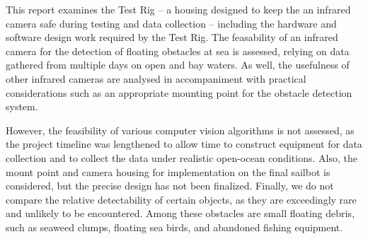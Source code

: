 
\iffalse
From the guideline:
This is where the subject of the report can be specified fully; indicate not only what you are examining, but also when and where, as appropriate. As well as knowing what to expect in your report, your reader needs to know what not to expect. Indicate the kinds of problems, places, times, and personnel that are not considered and the impact these omissions and constraints may have on your results. You may also want to explain why these limitations have been necessary.

Notes:
what does the report consider?
-test rig, design and development
-testing IR camera feasibility on two days
-developing a control system for the test rig, allowing for video capture
-the team might be able to get a better camera
-long cables seem to be fine

what didn't we do?
-we don't evaluate which algorithms are best
--we spent a lot of time getting ready to gather data (getting test rigs built and working)
--lots of time on video processing systems to get good contrast
-the lepton cannot see small objects such as logs
-we don't provide a final housing
--sailbot might use our lepton holder, but will need to design a smaller waterproof case for it

impact of omissions:
-we can suggest a lepton holder, but not a final housing
-our work will help the sailbot team test algorithms and gather data, but we can't comment on the best algorithms
\fi

This report examines the Test Rig -- a housing designed to keep the an infrared camera safe during testing and data collection -- including the hardware and software design work required by the Test Rig. The feasability of an infrared camera for the detection of floating obstacles at sea is assessed, relying on data gathered from multiple days on open and bay waters. As well, the usefulness of other infrared cameras are analysed in accompaniment with practical considerations such as an appropriate mounting point for the obstacle detection system.

However, the feasibility of various computer vision algorithms is not assessed, as the project timeline was lengthened to allow time to construct equipment for data collection and to collect the data under realistic open-ocean conditions. Also, the mount point and camera housing for implementation on the final sailbot is considered, but the precise design has not been finalized. Finally, we do not compare the relative detectability of certain objects, as they are exceedingly rare and unlikely to be encountered. Among these obstacles are small floating debris, such as seaweed clumps, floating sea birds, and abandoned fishing equipment.
